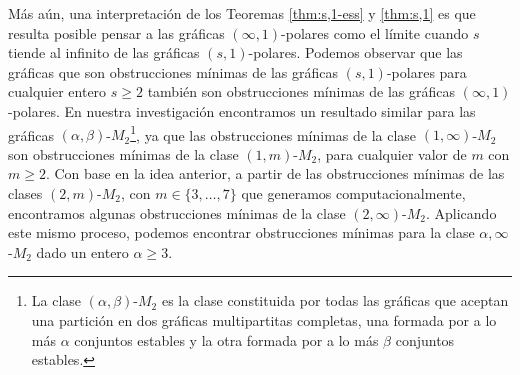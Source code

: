 M\'as a\'un, una interpretaci\'on de los Teoremas \ref{thm:s,1-ess}
y \ref{thm:s,1} es que resulta posible pensar a las gr\'aficas
$(\infty,1)$-polares como el l\'imite cuando $s$ tiende al
infinito de las gr\'aficas $(s,1)$-polares. Podemos observar que
las gráficas que son obstrucciones mínimas de las gráficas
$(s,1)$-polares para cualquier entero $s \ge 2$ también son
obstrucciones mínimas de las gráficas $(\infty,1)$-polares. En
nuestra investigación encontramos un resultado similar para las
gráficas $(\alpha,\beta)$-$M_2$\footnote{La clase
$(\alpha,\beta)$-$M_2$ es la clase constituida por todas las
gráficas que aceptan una partición en dos gráficas multipartitas
completas, una formada por a lo más $\alpha$ conjuntos estables
y la otra formada por a lo más $\beta$ conjuntos estables.}, ya
que las obstrucciones mínimas de la clase $(1,\infty)$-$M_2$ son
obstrucciones mínimas de la clase $(1,m)$-$M_2$, para cualquier
valor de $m$ con $m \ge 2$.  Con base en la idea anterior,
a partir de las obstrucciones mínimas de las clases
$(2,m)$-$M_2$, con $m \in \{ 3, \dots, 7 \}$ que generamos
computacionalmente, encontramos algunas obstrucciones mínimas
de la clase $(2,\infty)$-$M_2$. Aplicando este mismo proceso,
podemos encontrar obstrucciones mínimas para la clase $\alpha,
\infty$-$M_2$ dado un entero $\alpha \ge 3$.
